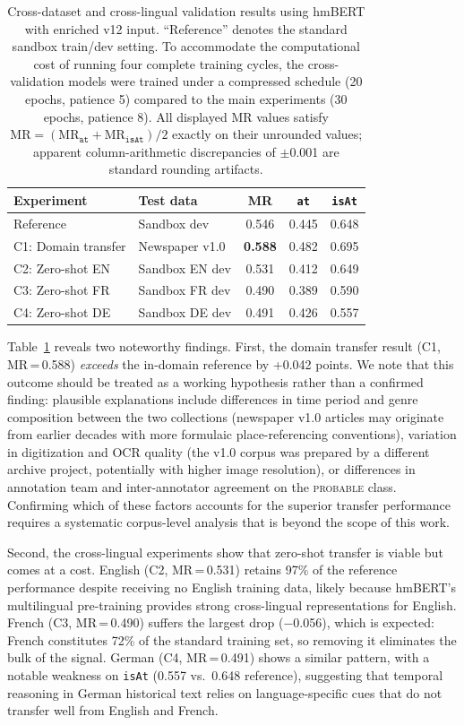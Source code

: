 \documentclass[11pt,a4paper]{article}
\begin{document}
\begin{table}[t]
\centering
\caption{Cross-dataset and cross-lingual validation results using hmBERT with enriched v12 input. ``Reference'' denotes the standard sandbox train/dev setting. To accommodate the computational cost of running four complete training cycles, the cross-validation models were trained under a compressed schedule (20 epochs, patience 5) compared to the main experiments (30 epochs, patience 8). All displayed MR values satisfy $\text{MR}=(\text{MR}_{\texttt{at}}+\text{MR}_{\texttt{isAt}})/2$ exactly on their unrounded values; apparent column-arithmetic discrepancies of $\pm$0.001 are standard rounding artifacts.}
\label{tab:crossval}
\begin{tabular}{llccc}
\toprule
\textbf{Experiment} & \textbf{Test data} & \textbf{MR} & \textbf{\texttt{at}} & \textbf{\texttt{isAt}} \\
\midrule
Reference & Sandbox dev & 0.546 & 0.445 & 0.648 \\
\midrule
C1: Domain transfer & Newspaper v1.0 & \textbf{0.588} & 0.482 & 0.695 \\
C2: Zero-shot EN & Sandbox EN dev & 0.531 & 0.412 & 0.649 \\
C3: Zero-shot FR & Sandbox FR dev & 0.490 & 0.389 & 0.590 \\
C4: Zero-shot DE & Sandbox DE dev & 0.491 & 0.426 & 0.557 \\
\bottomrule
\end{tabular}
\end{table}

Table~\ref{tab:crossval} reveals two noteworthy findings. First, the domain transfer result (C1, MR\,=\,0.588) \emph{exceeds} the in-domain reference by +0.042 points. We note that this outcome should be treated as a working hypothesis rather than a confirmed finding: plausible explanations include differences in time period and genre composition between the two collections (newspaper v1.0 articles may originate from earlier decades with more formulaic place-referencing conventions), variation in digitization and OCR quality (the v1.0 corpus was prepared by a different archive project, potentially with higher image resolution), or differences in annotation team and inter-annotator agreement on the \textsc{probable} class. Confirming which of these factors accounts for the superior transfer performance requires a systematic corpus-level analysis that is beyond the scope of this work.

Second, the cross-lingual experiments show that zero-shot transfer is viable but comes at a cost. English (C2, MR\,=\,0.531) retains 97\% of the reference performance despite receiving no English training data, likely because hmBERT's multilingual pre-training provides strong cross-lingual representations for English. French (C3, MR\,=\,0.490) suffers the largest drop ($-$0.056), which is expected: French constitutes 72\% of the standard training set, so removing it eliminates the bulk of the signal. German (C4, MR\,=\,0.491) shows a similar pattern, with a notable weakness on \texttt{isAt} (0.557 vs.\ 0.648 reference), suggesting that temporal reasoning in German historical text relies on language-specific cues that do not transfer well from English and French.
\end{document}
